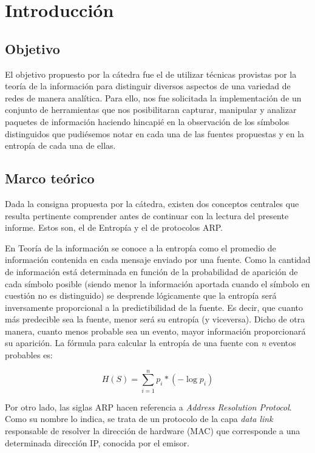\section{Introducci\'on}



\subsection{Objetivo}

El objetivo propuesto por la c\'atedra fue el de utilizar t\'ecnicas provistas por la teor\'ia de la informaci\'on para distinguir
diversos aspectos de una variedad de redes de manera anal\'itica. 
Para ello, nos fue solicitada la implementaci\'on de un conjunto de herramientas que nos posibilitaran capturar, manipular y analizar paquetes de informaci\'on haciendo hincapi\'e en la observaci\'on de los s\'imbolos distinguidos que pudi\'esemos notar en cada una de las fuentes propuestas y en la entrop\'ia de cada una de ellas.

\subsection{Marco te\'orico}

Dada la consigna propuesta por la c\'atedra, existen dos conceptos centrales que resulta pertinente comprender antes de continuar con la lectura del presente informe. Estos son, el de Entrop\'ia y el de protocolos ARP.

En Teor\'ia de la informaci\'on se conoce a la entrop\'ia como el promedio de informaci\'on contenida en cada mensaje enviado por una fuente. 
Como la cantidad de informaci\'on est\'a determinada en funci\'on de la probabilidad de aparici\'on de cada s\'imbolo posible (siendo menor la informaci\'on aportada cuando el s\'imbolo en cuesti\'on no es distinguido) se desprende l\'ogicamente que la entrop\'ia ser\'a inversamente proporcional a la predictibilidad  de la fuente. Es decir, que cuanto m\'as predecible sea la fuente, menor ser\'a su entrop\'ia (y viceversa).
Dicho de otra manera, cuanto menos probable sea un evento, mayor informaci\'on proporcionar\'a su aparici\'on.
 La f\'ormula para calcular la entrop\'ia de una fuente con \textit{n} eventos probables es:

 $$H(S) = \sum \limits_{i=1}^n p_i * (- \log{p_i})$$
 \newline

Por otro lado, las siglas ARP hacen referencia a \textit{Address Resolution Protocol}. Como su nombre lo indica, se trata de un protocolo de la capa \textit{data link} responsable de resolver la direcci\'on de hardware (MAC) que corresponde a una determinada direcci\'on IP, conocida por el emisor.

